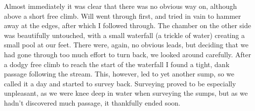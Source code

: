 Almost immediately it was clear that there was no obvious way on, although  above a short free climb. Will went through first, and tried in vain to hammer away at the edges, after which I followed through. The chamber on the other side was beautifully untouched, with a small waterfall (a trickle of water) creating a small pool at our feet. There were, again, no obvious leads, but deciding that we had gone through too much effort to turn back, we looked around carefully. After a dodgy free climb to reach the start of the waterfall I found a tight, dank passage following the stream. This, however, led to yet another sump, so we called it a day and started to survey back. 
Surveying proved to be especially unpleasant, as we were knee deep in water when surveying the sumps, but as we hadn't discovered much passage, it thankfully ended soon.
